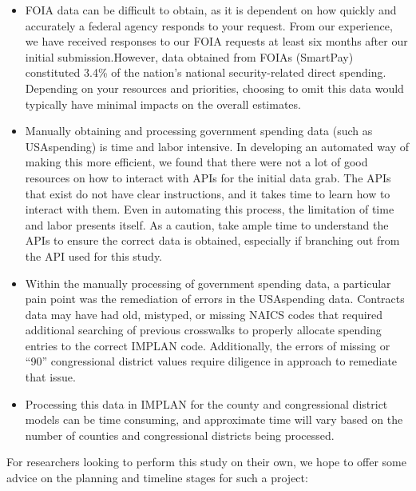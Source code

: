 \documentclass[
]{book}
\providecommand{\tightlist}{%
  \setlength{\itemsep}{0pt}\setlength{\parskip}{0pt}}
\begin{document}
\begin{itemize}
\tightlist
\item
  FOIA data can be difficult to obtain, as it is dependent on how quickly and accurately a federal agency responds to your request. From our experience, we have received responses to our FOIA requests at least six months after our initial submission.However, data obtained from FOIAs (SmartPay) constituted 3.4\% of the nation's national security-related direct spending. Depending on your resources and priorities, choosing to omit this data would typically have minimal impacts on the overall estimates.
\item
  Manually obtaining and processing government spending data (such as USAspending) is time and labor intensive. In developing an automated way of making this more efficient, we found that there were not a lot of good resources on how to interact with APIs for the initial data grab. The APIs that exist do not have clear instructions, and it takes time to learn how to interact with them. Even in automating this process, the limitation of time and labor presents itself. As a caution, take ample time to understand the APIs to ensure the correct data is obtained, especially if branching out from the API used for this study.\\
\item
  Within the manually processing of government spending data, a particular pain point was the remediation of errors in the USAspending data. Contracts data may have had old, mistyped, or missing NAICS codes that required additional searching of previous crosswalks to properly allocate spending entries to the correct IMPLAN code. Additionally, the errors of missing or ``90'' congressional district values require diligence in approach to remediate that issue.
\item
  Processing this data in IMPLAN for the county and congressional district models can be time consuming, and approximate time will vary based on the number of counties and congressional districts being processed.
\end{itemize}

For researchers looking to perform this study on their own, we hope to offer some advice on the planning and timeline stages for such a project:
\end{document}
